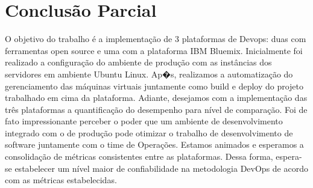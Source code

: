 \section{Conclusão Parcial}

O objetivo do trabalho é a implementação de 3 plataformas de Devops: duas com ferramentas open source e uma com a plataforma IBM Bluemix. Inicialmente foi realizado a configuração do ambiente de produção com as instâncias dos servidores em ambiente Ubuntu Linux. Ap�s, realizamos a automatização do gerenciamento das máquinas virtuais juntamente como build e deploy do projeto trabalhado em cima da plataforma. Adiante, desejamos com a implementação das três plataformas a quantificação do desempenho para nível de comparação. Foi de fato impressionante perceber o poder que um ambiente de desenvolvimento integrado com o de produção  pode otimizar o trabalho de desenvolvimento de software juntamente com o time de Operações. Estamos animados e esperamos a consolidação de métricas consistentes entre as plataformas. Dessa forma, espera-se estabelecer um nível maior de confiabilidade na metodologia DevOps de acordo com as métricas estabelecidas.

